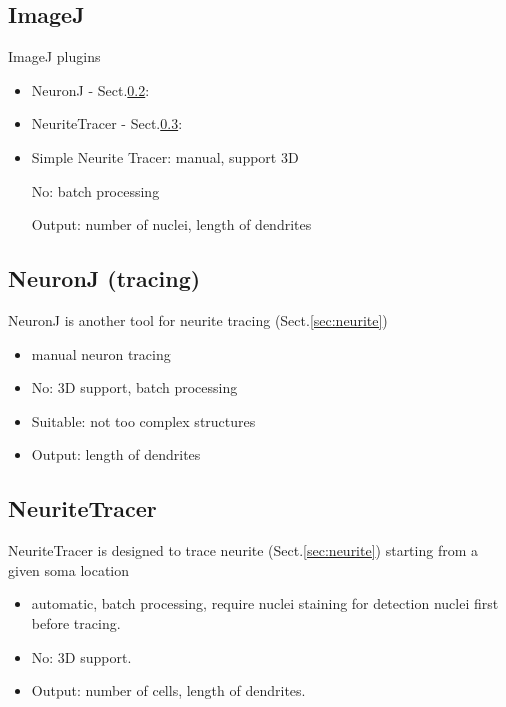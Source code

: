 

\subsection{ImageJ}
\label{sec:ImageJ}


ImageJ plugins
\begin{itemize}
  \item NeuronJ - Sect.\ref{sec:NeuronJ}: 
  
  \item NeuriteTracer - Sect.\ref{sec:NeuriteTracer}: 
  
  \item Simple Neurite Tracer: manual, support 3D
  
No: batch processing

Output: number of nuclei, length of dendrites
\end{itemize}

\subsection{NeuronJ (tracing)}
\label{sec:NeuronJ}

NeuronJ is another tool for neurite tracing (Sect.\ref{sec:neurite})
\begin{itemize}
  \item  manual neuron tracing
  
  \item No: 3D support, batch processing
  
  \item Suitable: not too complex structures
  
  \item Output: length of dendrites
  
\end{itemize}


\subsection{NeuriteTracer}
\label{sec:NeuriteTracer}

NeuriteTracer is designed to trace neurite (Sect.\ref{sec:neurite}) starting
from a given soma location
\begin{itemize}
  \item  automatic, batch processing, require nuclei staining for detection nuclei first
before tracing.
  
  \item  No: 3D support.
  
  \item Output: number of cells, length of dendrites.
  
\end{itemize}

